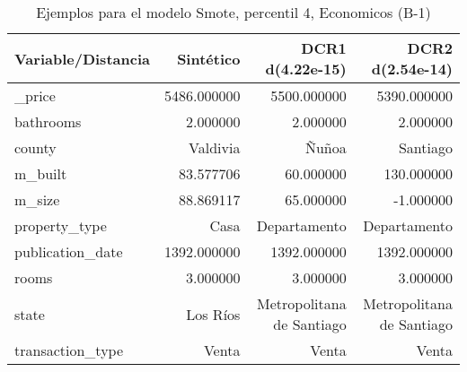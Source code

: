 \begin{table}[H]
\centering
\fontsize{10}{14}\selectfont
\caption{Ejemplos para el modelo Smote, percentil 4, Economicos (B-1)}
\label{table-example-economicos-b-1-smote-enc-4p}
\begin{tabular}{|l|r|r|r|}
\hline
\rowcolor[gray]{0.8}
Variable/Distancia & Sintético & DCR1 d(4.22e-15) & DCR2 d(2.54e-14) \\
\hline \_price & \cellcolor[rgb]{0.9, 0.54, 0.52} 5486.000000 & 5500.000000 & 5390.000000 \\
\hline bathrooms & \cellcolor[rgb]{0.9, 0.54, 0.52} 2.000000 & \cellcolor[rgb]{0.9, 0.54, 0.52} 2.000000 & \cellcolor[rgb]{0.9, 0.54, 0.52} 2.000000 \\
\hline county & \cellcolor[rgb]{0.9, 0.54, 0.52} Valdivia & Ñuñoa & Santiago \\
\hline m\_built & \cellcolor[rgb]{0.9, 0.54, 0.52} 83.577706 & 60.000000 & 130.000000 \\
\hline m\_size & \cellcolor[rgb]{0.9, 0.54, 0.52} 88.869117 & 65.000000 & -1.000000 \\
\hline property\_type & \cellcolor[rgb]{0.9, 0.54, 0.52} Casa & Departamento & Departamento \\
\hline publication\_date & \cellcolor[rgb]{0.9, 0.54, 0.52} 1392.000000 & \cellcolor[rgb]{0.9, 0.54, 0.52} 1392.000000 & \cellcolor[rgb]{0.9, 0.54, 0.52} 1392.000000 \\
\hline rooms & \cellcolor[rgb]{0.9, 0.54, 0.52} 3.000000 & \cellcolor[rgb]{0.9, 0.54, 0.52} 3.000000 & \cellcolor[rgb]{0.9, 0.54, 0.52} 3.000000 \\
\hline state & \cellcolor[rgb]{0.9, 0.54, 0.52} Los Ríos & Metropolitana de Santiago & Metropolitana de Santiago \\
\hline transaction\_type & \cellcolor[rgb]{0.9, 0.54, 0.52} Venta & \cellcolor[rgb]{0.9, 0.54, 0.52} Venta & \cellcolor[rgb]{0.9, 0.54, 0.52} Venta \\
\hline
\end{tabular}
\end{table}
